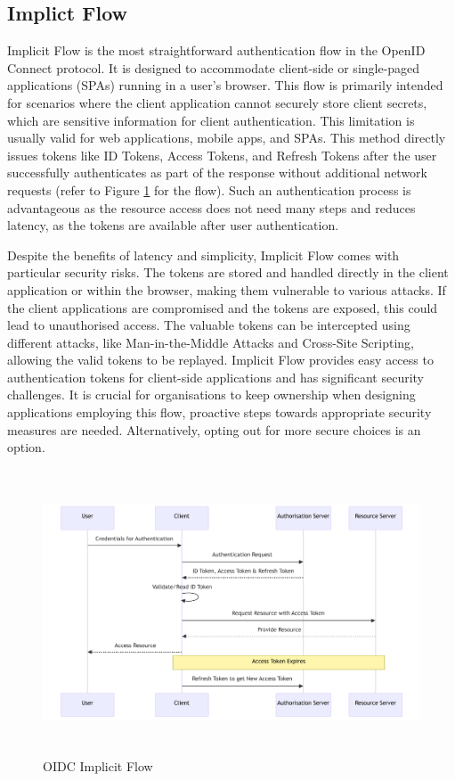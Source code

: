 \subsection{Implict Flow}
Implicit Flow is the most straightforward authentication flow in the OpenID Connect protocol.
It is designed to accommodate client-side or single-paged applications (SPAs) running in a user's browser.
This flow is primarily intended for scenarios where the client application cannot securely store client secrets, which are sensitive information for client authentication.
This limitation is usually valid for web applications, mobile apps, and SPAs.
This method directly issues tokens like ID Tokens, Access Tokens, and Refresh Tokens after the user successfully authenticates as part of the response without additional network requests (refer to Figure \ref{fig:implicit_flow} for the flow).
Such an authentication process is advantageous as the resource access does not need many steps and reduces latency, as the tokens are available after user authentication. 

Despite the benefits of latency and simplicity, Implicit Flow comes with particular security risks.
The tokens are stored and handled directly in the client application or within the browser, making them vulnerable to various attacks.
If the client applications are compromised and the tokens are exposed, this could lead to unauthorised access.
The valuable tokens can be intercepted using different attacks, like Man-in-the-Middle Attacks and Cross-Site Scripting, allowing the valid tokens to be replayed.
Implicit Flow provides easy access to authentication tokens for client-side applications and has significant security challenges.
It is crucial for organisations to keep ownership when designing applications employing this flow, proactive steps towards appropriate security measures are needed. Alternatively, opting out for more secure choices is an option.

\begin{figure}[h!]
\centering
\includegraphics[width=\textwidth, height=320px]{pics/implicit_flow.pdf}
\caption{OIDC Implicit Flow}
\label{fig:implicit_flow}
\end{figure}

